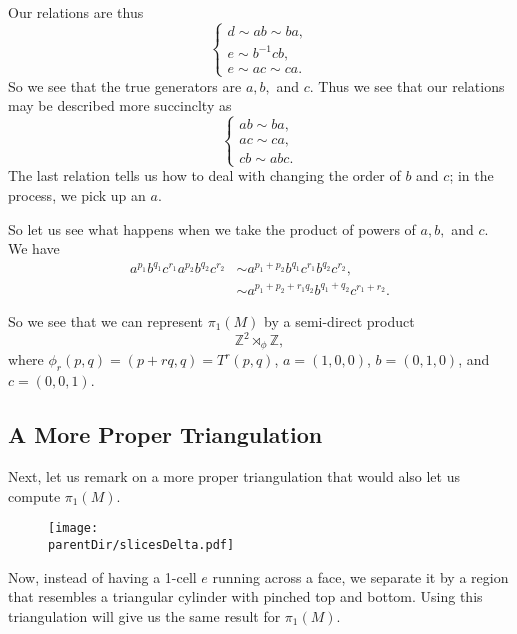 Our relations are thus
\begin{equation}
\begin{cases}
d \sim ab \sim ba, \\
e \sim b^{-1}cb , \\
e \sim ac \sim ca.
\end{cases}
\end{equation}
So we see that the true generators are \(a, b,\) and \(c\). Thus we see that our relations may be described more succinclty as
\begin{equation}
\begin{cases}
ab \sim ba, \\
ac \sim ca, \\
cb \sim abc.
\end{cases}
\end{equation}
The last relation tells us how to deal with changing the order of \(b\) and \(c\); in the process, we pick up an \(a\).

So let us see what happens when we take the product of powers of \(a, b,\) and \(c\). We have
\begin{align}
a^{p_1}b^{q_1}c^{r_1} a^{p_2}b^{q_2}c^{r_2} & \sim a^{p_1 + p_2} b^{q_1}c^{r_1}b^{q_2}c^{r_2}, \\
 & \sim a^{p_1 + p_2 + r_1 q_2} b^{q_1 + q_2} c^{r_1 + r_2}.  
\end{align}

So we see that we can represent \(\pi_1(M)\) by a semi-direct product
\begin{equation}
\mathbb Z^2 \rtimes_\phi \mathbb Z,
\end{equation}
where \(\phi_r(p, q) = (p + rq, q) = T^r (p, q)\), \(a = (1, 0, 0)\), \(b = (0, 1, 0)\), and \(c = (0, 0, 1)\).

\subsection*{A More Proper Triangulation}

Next, let us remark on a more proper triangulation that would also let us compute \(\pi_1(M)\). 
\begin{figure}[H]
\centering
\texttt{[image: \\parentDir/slicesDelta.pdf]}
\end{figure}

Now, instead of having a 1-cell \(e\) running across a face, we separate it by a region that resembles a triangular cylinder with pinched top and bottom.
Using this triangulation will give us the same result for \(\pi_1(M)\).
